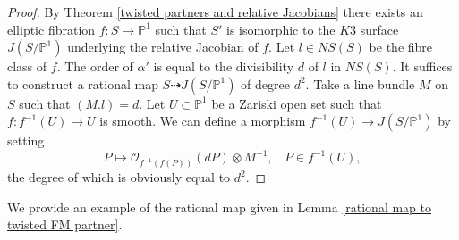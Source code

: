 \documentclass{article}
\theoremstyle{plain}
\theoremstyle{definition}
\theoremstyle{remark}
\newcommand{\proj}{{\mathbb P}}
\begin{document}
\begin{proof}
By Theorem \ref{twisted partners and relative Jacobians} 
there exists an elliptic fibration $f : S \to {\proj}^{1}$ such that 
$S'$ is isomorphic to the $K3$ surface $J(S/{\proj}^{1})$ underlying the relative Jacobian of $f$.  
Let $l \in NS(S)$ be the fibre class of $f$.  
The order of $\alpha '$ is equal to the divisibility $d$ of $l$ in $NS(S)$.  
It suffices to construct a rational map 
$S \dashrightarrow J(S/{\proj}^{1})$ 
of degree $d^{2}$.  
Take a line bundle $M$ on $S$ such that $(M.l)=d$. 
Let $U \subset {\proj}^{1}$ be a Zariski open set 
such that $f : f^{-1}(U) \to U$ is smooth.  
We can define a morphism 
$f^{-1}(U) \to J(S/{\proj}^{1})$ 
by setting 
\begin{equation}\label{relative multiplication map}
P \mapsto \mathcal{O}_{f^{-1}(f(P))}(dP)\otimes M^{-1}, \: \: \: \: P \in f^{-1}(U), 
\end{equation}
the degree of which is obviously equal to $d^{2}$. 
\end{proof}


We provide an example of the rational map given in Lemma \ref{rational map to twisted FM partner}.   
\end{document}

